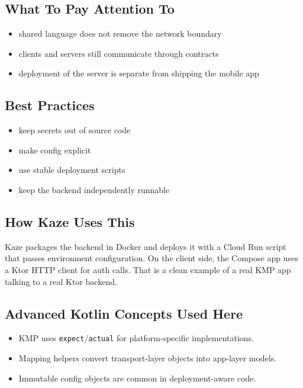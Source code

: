 \documentclass[11pt,a4paper]{article}
\begin{document}
\subsection{What To Pay Attention To}

\begin{itemize}
    \item shared language does not remove the network boundary
    \item clients and servers still communicate through contracts
    \item deployment of the server is separate from shipping the mobile app
\end{itemize}

\subsection{Best Practices}

\begin{itemize}
    \item keep secrets out of source code
    \item make config explicit
    \item use stable deployment scripts
    \item keep the backend independently runnable
\end{itemize}

\subsection{How Kaze Uses This}

Kaze packages the backend in Docker and deploys it with a Cloud Run script that passes environment configuration. On the client side, the Compose app uses a Ktor HTTP client for auth calls. That is a clean example of a real KMP app talking to a real Ktor backend.

\subsection{Advanced Kotlin Concepts Used Here}

\begin{itemize}
    \item KMP uses \texttt{expect}/\texttt{actual} for platform-specific implementations.
    \item Mapping helpers convert transport-layer objects into app-layer models.
    \item Immutable config objects are common in deployment-aware code.
\end{itemize}
\end{document}
